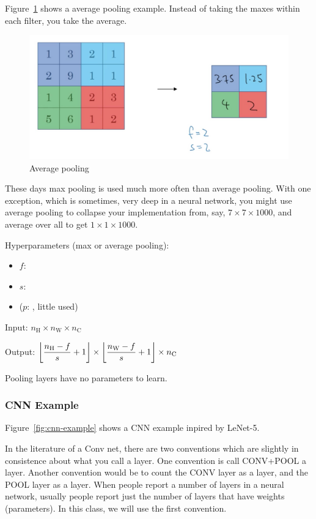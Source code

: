 \documentclass[UTF8]{article}
\DeclarePairedDelimiter\floor{\lfloor}{\rfloor}
\begin{document}
Figure~\ref{fig:average-pooling} shows a average pooling example. Instead of taking the maxes
within each filter, you take the average.

\begin{figure}[htb]
    \centering
    \includegraphics[width=40em]{figures/average-pooling}
    \caption{Average pooling}
    \label{fig:average-pooling}
\end{figure}

These days max pooling is used much more often than average pooling. With one exception, which is
sometimes, very deep in a neural network, you might use average pooling to collapse your
implementation from, say, $7 \times 7 \times 1000$, and average over all to get $1 \times 1 \times
1000$.

Hyperparameters (max or average pooling):
\begin{itemize}
    \item $f$: 
    \item $s$: 
    \item ($p$: , little used)
\end{itemize}

Input: $ n_{\text{H}} \times n_{\text{W}} \times n_{\text{C}} $

Output: $\displaystyle \floor*{\frac{n_{\text{H}}-f}{s}+1} \times
\floor*{\frac{n_{\text{W}}-f}{s}+1} \times n_{\text{C}} $

Pooling layers have no parameters to learn.

\subsubsection{CNN Example}
Figure~\ref{fig:cnn-example} shows a CNN example inpired by LeNet-5.

In the literature of a Conv net, there are two conventions which are slightly in consistence about
what you call a layer. One convention is call CONV+POOL a layer. Another convention would be to
count the CONV layer as a layer, and the POOL layer as a layer. When people report a number of
layers in a neural network, usually people report just the number of layers that have weights
(parameters). In this class, we will use the first convention.
\end{document}
